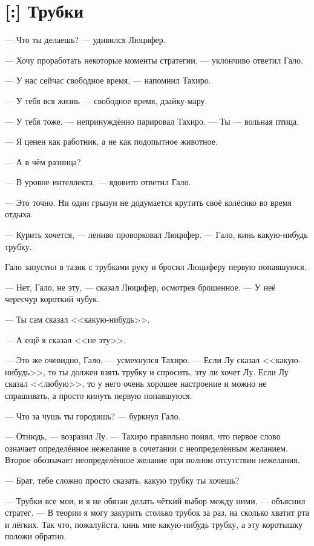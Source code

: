 \section{[:] Трубки}

\textspace

--- Что ты делаешь? --- удивился Люцифер.

--- Хочу проработать некоторые моменты стратегии, --- уклончиво ответил Гало.

--- У нас сейчас свободное время, --- напомнил Тахиро.

--- У тебя вся жизнь --- свободное время, дзайку-мару.

--- У тебя тоже, --- непринуждённо парировал Тахиро.
--- Ты --- вольная птица.

--- Я ценен как работник, а не как подопытное животное.

--- А в чём разница?

--- В уровне интеллекта, --- ядовито ответил Гало.

--- Это точно.
Ни один грызун не додумается крутить своё колёсико во время отдыха.

--- Курить хочется, --- лениво проворковал Люцифер.
--- Гало, кинь какую-нибудь трубку.

Гало запустил в тазик с трубками руку и бросил Люциферу первую попавшуюся.

--- Нет, Гало, не эту, --- сказал Люцифер, осмотрев брошенное.
--- У неё чересчур короткий чубук.

--- Ты сам сказал <<какую-нибудь>>.

--- А ещё я сказал <<не эту>>.

--- Это же очевидно, Гало, --- усмехнулся Тахиро.
--- Если Лу сказал <<какую-нибудь>>, то ты должен взять трубку и спросить, эту ли хочет Лу.
Если Лу сказал <<любую>>, то у него очень хорошее настроение и можно не спрашивать, а просто кинуть первую попавшуюся.

--- Что за чушь ты городишь? --- буркнул Гало.

--- Отнюдь, --- возразил Лу.
--- Тахиро правильно понял, что первое слово означает определённое нежелание в сочетании с неопределённым желанием.
Второе обозначает неопределённое желание при полном отсутствии нежелания.

--- Брат, тебе сложно просто сказать, какую трубку ты хочешь?

--- Трубки все мои, и я не обязан делать чёткий выбор между ними, --- объяснил стратег.
--- В теории я могу закурить столько трубок за раз, на сколько хватит рта и лёгких.
Так что, пожалуйста, кинь мне какую-нибудь трубку, а эту коротышку положи обратно.

